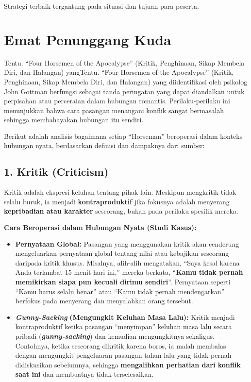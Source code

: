\documentclass[
  letterpaper,
  DIV=11,
  numbers=noendperiod]{scrreprt}
\providecommand{\tightlist}{%
  \setlength{\itemsep}{0pt}\setlength{\parskip}{0pt}}
\begin{document}
Strategi terbaik tergantung pada situasi dan tujuan para peserta.

\section{Emat Penunggang Kuda}\label{emat-penunggang-kuda}

Tentu. ``Four Horsemen of the Apocalypse'' (Kritik, Penghinaan, Sikap
Membela Diri, dan Halangan) yangTentu. ``Four Horsemen of the
Apocalypse'' (Kritik, Penghinaan, Sikap Membela Diri, dan Halangan) yang
diidentifikasi oleh psikolog John Gottman berfungsi sebagai tanda
peringatan yang dapat diandalkan untuk perpisahan atau perceraian dalam
hubungan romantis. Perilaku-perilaku ini menunjukkan bahwa cara pasangan
menangani konflik sangat bermasalah sehingga membahayakan hubungan itu
sendiri.

Berikut adalah analisis bagaimana setiap ``Horseman'' beroperasi dalam
konteks hubungan nyata, berdasarkan definisi dan dampaknya dari sumber:

\subsection{1. Kritik (Criticism)}\label{kritik-criticism}

Kritik adalah ekspresi keluhan tentang pihak lain. Meskipun mengkritik
tidak selalu buruk, ia menjadi \textbf{kontraproduktif} jika fokusnya
adalah menyerang \textbf{kepribadian atau karakter} seseorang, bukan
pada perilaku spesifik mereka.

\textbf{Cara Beroperasi dalam Hubungan Nyata (Studi Kasus):}

\begin{itemize}
\tightlist
\item
  \textbf{Pernyataan Global:} Pasangan yang menggunakan kritik akan
  cenderung mengeluarkan pernyataan global tentang nilai atau kebajikan
  seseorang daripada kritik khusus. Misalnya, alih-alih mengatakan,
  ``Saya kesal karena Anda terlambat 15 menit hari ini,'' mereka
  berkata, ``\textbf{Kamu tidak pernah memikirkan siapa pun kecuali
  dirimu sendiri}''. Pernyataan seperti ``Kamu harus selalu benar'' atau
  ``Kamu tidak pernah mendengarkan'' berfokus pada menyerang dan
  menyalahkan orang tersebut.
\item
  \textbf{\emph{Gunny-Sacking}} \textbf{(Mengungkit Keluhan Masa Lalu):}
  Kritik menjadi kontraproduktif ketika pasangan ``menyimpan'' keluhan
  masa lalu secara pribadi (\textbf{\emph{gunny-sacking}}) dan kemudian
  mengungkitnya sekaligus. Contohnya, ketika seseorang dikritik karena
  boros, ia malah membalas dengan mengungkit pengeluaran pasangan tahun
  lalu yang tidak pernah didiskusikan sebelumnya, sehingga
  \textbf{mengalihkan perhatian dari konflik saat ini} dan membuatnya
  tidak terselesaikan.
\end{itemize}
\end{document}
